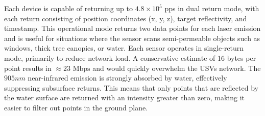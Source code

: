 \documentclass{erauthesis}
\begin{document}
Each device is capable of returning up to $4.8 \times 10^5$ \ac{pps} in dual return mode, with each return consisting of position coordinates (x, y, z), target reflectivity, and timestamp.
This operational mode returns two data points for each laser emission and is useful for situations where the sensor scans semi-permeable objects such as windows, thick tree canopies, or water.
Each sensor operates in single-return mode, primarily to reduce network load.
A conservative estimate of 16 bytes per point results in $\approx 23 \text{ Mbps}$ and would quickly overwhelm the \acp{USV} network.
The $905 nm$ near-infrared emission is strongly absorbed by water, effectively suppressing subsurface returns.
This means that only points that are reflected by the water surface are returned with an intensity greater than zero, making it easier to filter out points in the ground plane.




\end{document}
